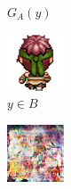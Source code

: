 \documentclass{beamer}
\begin{document}
\begin{frame}
\begin{figure}[htb]
\begin{subfigure}[b]{0.23\linewidth}
        \caption{$G_A(y)$}
      \end{subfigure}
      \begin{subfigure}[b]{0.23\linewidth}
        \includegraphics[width=\linewidth]{exp5_epoch140_real_B.png}
        \caption{$y \in B$}
      \end{subfigure}
      \begin{subfigure}[b]{0.23\linewidth}
        \includegraphics[width=\linewidth]{exp5_epoch140_fake_A.png}

\end{subfigure}
\end{figure}
\end{frame}
\end{document}
